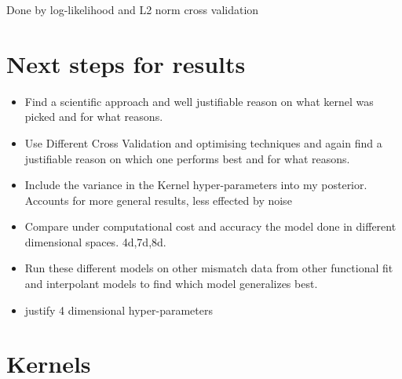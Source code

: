 \documentclass{article}
\begin{document}

\noindent
Done by log-likelihood and L2 norm cross validation


\section{Next steps for results}

\begin{itemize}
     \item Find a scientific approach and well justifiable reason on what kernel was picked and for what reasons.
     \item Use Different Cross Validation and optimising techniques and again find a justifiable reason on which one performs best and for what reasons.
     \item Include the variance in the Kernel hyper-parameters into my posterior. Accounts for more general results, less effected by noise
    \item Compare under computational cost and accuracy the model done in different dimensional spaces. 4d,7d,8d.
    \item Run these different models on other mismatch data from other functional fit and interpolant models to find which model generalizes best.
    \item justify 4 dimensional hyper-parameters
\end{itemize}


\section{Kernels}
\end{document}
